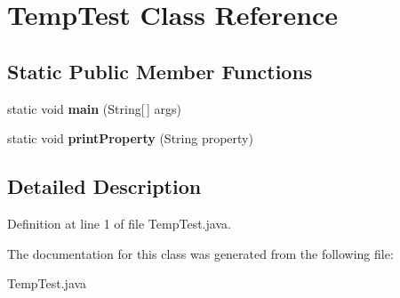 \section{Temp\-Test Class Reference}
\label{classTempTest}
\subsection*{Static Public Member Functions}
\begin{CompactItemize}
\item 
static void {\bf main} (String[$\,$] args)\label{classTempTest_201399ab75b9e54f7c1827af5e105d3d}

\item 
static void {\bf print\-Property} (String property)\label{classTempTest_002df4b218a3e251f3e8bacb278ad460}

\end{CompactItemize}


\subsection{Detailed Description}




Definition at line 1 of file Temp\-Test.java.

The documentation for this class was generated from the following file:\begin{CompactItemize}
\item 
Temp\-Test.java\end{CompactItemize}
